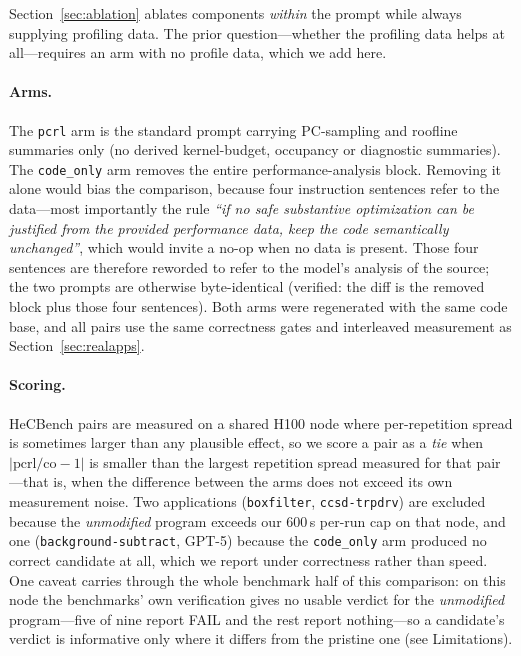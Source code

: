 Section~\ref{sec:ablation} ablates components \emph{within} the prompt while always supplying profiling
data. The prior question---whether the profiling data helps at all---requires an arm with no profile
data, which we add here.

\paragraph{Arms.}
The \texttt{pcrl} arm is the standard prompt carrying PC-sampling and roofline summaries only (no
derived kernel-budget, occupancy or diagnostic summaries). The \texttt{code\_only} arm removes the
entire performance-analysis block. Removing it alone would bias the comparison, because four
instruction sentences refer to the data---most importantly the rule \textit{``if no safe substantive
optimization can be justified from the provided performance data, keep the code semantically
unchanged''}, which would invite a no-op when no data is present. Those four sentences are therefore
reworded to refer to the model's analysis of the source; the two prompts are otherwise byte-identical
(verified: the diff is the removed block plus those four sentences). Both arms were regenerated with
the same code base, and all pairs use the same correctness gates and interleaved measurement as
Section~\ref{sec:realapps}.

\paragraph{Scoring.}
HeCBench pairs are measured on a shared H100 node where per-repetition spread is sometimes larger than
any plausible effect, so we score a pair as a \emph{tie} when $|\mathrm{pcrl}/\mathrm{co}-1|$ is smaller
than the largest repetition spread measured for that pair---that is, when the difference between the
arms does not exceed its own measurement noise. Two applications (\texttt{boxfilter},
\texttt{ccsd-trpdrv}) are excluded because the \emph{unmodified} program exceeds our $600$\,s per-run
cap on that node, and one (\texttt{background-subtract}, GPT-5) because the \texttt{code\_only} arm
produced no correct candidate at all, which we report under correctness rather than speed. One
caveat carries through the whole benchmark half of this comparison: on this node the benchmarks' own
verification gives no usable verdict for the \emph{unmodified} program---five of nine report FAIL and
the rest report nothing---so a candidate's verdict is informative only where it differs from the
pristine one (see Limitations).

